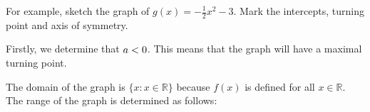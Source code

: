          \label{m39345*id244652}For example, sketch the graph of \begin{math}g\left(x\right)=-\frac{1}{2}{x}^{2}-3\end{math}. Mark the intercepts, turning point and axis of symmetry.\par 
          \label{m39345*id244698}Firstly, we determine that \begin{math}a<{}0\end{math}. This means that the graph will have a maximal turning point.\par 
          \label{m39345*id244718}The domain of the graph is \begin{math}\{x:x\in \mathbb{R}\}\end{math} because \begin{math}f\left(x\right)\end{math} is defined for all \begin{math}x\in \mathbb{R}\end{math}. The range of the graph is determined as follows:\par 
          \label{m39345*id244783}\nopagebreak\noindent{}
